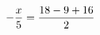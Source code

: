 \documentclass[preview]{standalone}
\begin{document}
\begin{align*}
\special{dvisvgm:raw <g id='unique000'>}- \frac{x}{5} = \frac{18 - 9 + 16}{2}\special{dvisvgm:raw </g>}
\end{align*}
\end{document}
